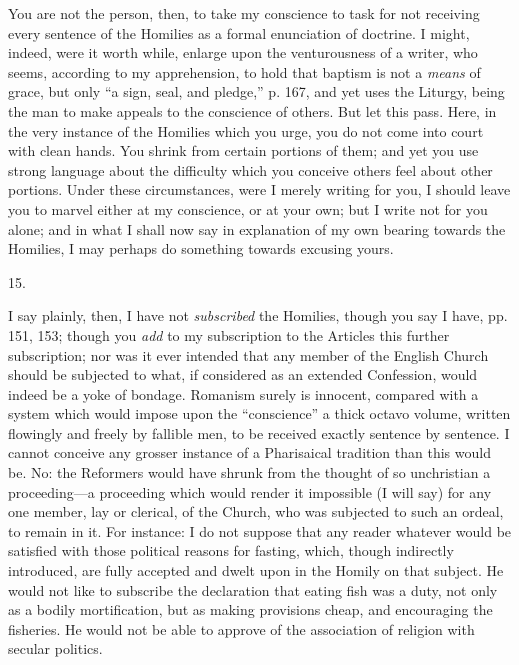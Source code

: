 You are not the person, then, to take my
conscience to task for not receiving every sentence of the Homilies as
a formal enunciation of doctrine. I might, indeed, were it worth
while, enlarge upon the venturousness of a writer, who seems,
according to my apprehension, to hold that baptism is not a \emph{means}
of grace, but only ``a sign, seal, and pledge,'' p. 167, and yet uses
the Liturgy, being the man to make appeals to the conscience of
others. But let this pass. Here, in the very instance of the Homilies
which you urge, you do not come into court with clean hands. You
shrink from certain portions of them; and yet you use strong language
about the difficulty which you conceive others feel about other
portions. Under these circumstances, were I merely writing for you, I
should leave you to marvel either at my conscience, or at your own;
but I write not for you alone; and in what I shall now say in
explanation of my own bearing towards the Homilies, I may perhaps do
something towards excusing yours.

15.

I say plainly, then, I have not \emph{subscribed}
the Homilies, though you say I have, pp. 151, 153; though you \emph{add}
to my subscription to the Articles this further subscription; nor was
it ever intended that any member of the English Church should be
subjected to what, if considered as an extended Confession, would
indeed be a yoke of bondage. Romanism surely is innocent, compared
with a system which would impose upon the ``conscience'' a thick octavo
volume, written flowingly and freely by fallible men, to be received
exactly sentence by sentence. I cannot conceive any grosser instance
of a Pharisaical tradition than this would be. No: the Reformers would
have shrunk from the thought of so unchristian a proceeding—a
proceeding which would render it impossible (I will say) for any one
member, lay or clerical, of the Church, who was subjected to
such an ordeal, to remain in it. For instance: I do not suppose that
any reader whatever would be satisfied with those political reasons
for fasting, which, though indirectly introduced, are fully accepted
and dwelt upon in the Homily on that subject. He would not like to
subscribe the declaration that eating fish was a duty, not only as a
bodily mortification, but as making provisions cheap, and encouraging
the fisheries. He would not be able to approve of the association of
religion with secular politics.

